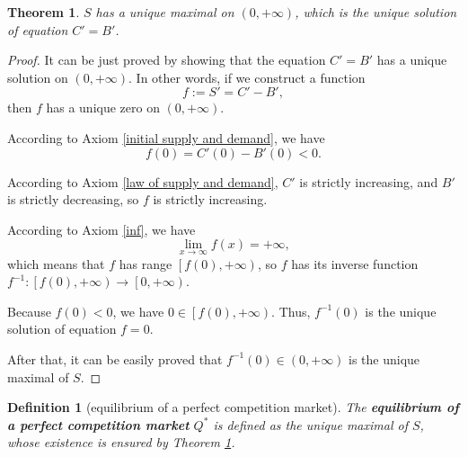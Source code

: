 \documentclass{article}
\newtheorem{theorem}{Theorem}[subsection]
\newtheorem{definition}{Definition}[subsection]
\begin{document}
\begin{theorem}
\label{perfect competition equilibrium}
$S$ has a unique maximal on $\left(0,+\infty\right)$,
which is the unique solution of equation $C'=B'$.
\end{theorem}
\begin{proof}
It can be just proved by showing that the equation $C'=B'$ has a unique solution on $\left(0,+\infty\right)$.
In other words, if we construct a function $$f:=S'=C'-B',$$ then $f$ has a unique zero on $\left(0,+\infty\right)$.

According to Axiom \ref{initial supply and demand}, we have
$$f\!\left(0\right)=C'\!\left(0\right)-B'\!\left(0\right)<0.$$

According to Axiom \ref{law of supply and demand}, $C'$ is strictly increasing, and $B'$ is strictly decreasing, so $f$ is strictly increasing.

According to Axiom \ref{inf}, we have
$$\lim_{x\to\infty}f\!\left(x\right)=+\infty,$$
which means that $f$ has range $\left[f\!\left(0\right),+\infty\right)$,
so $f$ has its inverse function $f^{-1}:\left[f\!\left(0\right),+\infty\right)\to\left[0,+\infty\right)$.

Because $f\!\left(0\right)<0$, we have $0\in\left[f\!\left(0\right),+\infty\right)$.
Thus, $f^{-1}\!\left(0\right)$ is the unique solution of equation $f=0$.

After that, it can be easily proved that $f^{-1}\!\left(0\right)\in\left(0,+\infty\right)$ is the unique maximal of $S$.
\end{proof}

\begin{definition}[equilibrium of a perfect competition market]
\label{def perfect competition equilibrium}
The \textbf{equilibrium of a perfect competition market} $Q^*$ is defined as the unique maximal of $S$, whose existence is ensured by Theorem \ref{perfect competition equilibrium}.
\end{definition}
\end{document}
